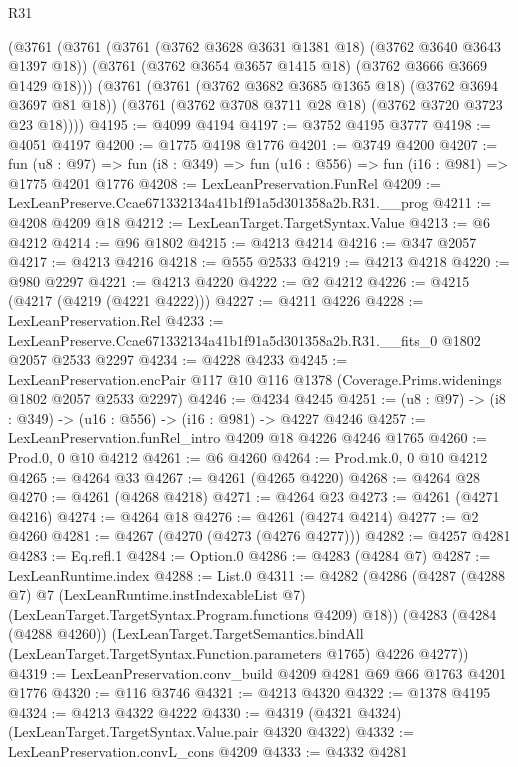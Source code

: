 \begin{lexlean}{R31}
\begin{coremodule}
    (@3761
      (@3761
        (@3761 (@3762 @3628 @3631 @1381 @18) (@3762 @3640 @3643 @1397 @18))
        (@3761 (@3762 @3654 @3657 @1415 @18) (@3762 @3666 @3669 @1429 @18)))
      (@3761
        (@3761 (@3762 @3682 @3685 @1365 @18) (@3762 @3694 @3697 @81 @18))
        (@3761 (@3762 @3708 @3711 @28 @18) (@3762 @3720 @3723 @23 @18))))
@4195 := @4099 @4194
@4197 := @3752 @4195 @3777
@4198 := @4051 @4197
@4200 := @1775 @4198 @1776
@4201 := @3749 @4200
@4207 := fun (u8 : @97) =>
  fun (i8 : @349) => fun (u16 : @556) => fun (i16 : @981) => @1775 @4201 @1776
@4208 := LexLeanPreservation.FunRel
@4209 := LexLeanPreserve.Ccae671332134a41b1f91a5d301358a2b.R31.__prog
@4211 := @4208 @4209 @18
@4212 := LexLeanTarget.TargetSyntax.Value
@4213 := @6 @4212
@4214 := @96 @1802
@4215 := @4213 @4214
@4216 := @347 @2057
@4217 := @4213 @4216
@4218 := @555 @2533
@4219 := @4213 @4218
@4220 := @980 @2297
@4221 := @4213 @4220
@4222 := @2 @4212
@4226 := @4215 (@4217 (@4219 (@4221 @4222)))
@4227 := @4211 @4226
@4228 := LexLeanPreservation.Rel
@4233 := LexLeanPreserve.Ccae671332134a41b1f91a5d301358a2b.R31.__fits_0 @1802 @2057 @2533 @2297
@4234 := @4228 @4233
@4245 := LexLeanPreservation.encPair
    @117
    @10
    @116
    @1378
    (Coverage.Prims.widenings @1802 @2057 @2533 @2297)
@4246 := @4234 @4245
@4251 := (u8 : @97) -> (i8 : @349) -> (u16 : @556) -> (i16 : @981) -> @4227 @4246
@4257 := LexLeanPreservation.funRel_intro @4209 @18 @4226 @4246 @1765
@4260 := Prod.{0, 0} @10 @4212
@4261 := @6 @4260
@4264 := Prod.mk.{0, 0} @10 @4212
@4265 := @4264 @33
@4267 := @4261 (@4265 @4220)
@4268 := @4264 @28
@4270 := @4261 (@4268 @4218)
@4271 := @4264 @23
@4273 := @4261 (@4271 @4216)
@4274 := @4264 @18
@4276 := @4261 (@4274 @4214)
@4277 := @2 @4260
@4281 := @4267 (@4270 (@4273 (@4276 @4277)))
@4282 := @4257 @4281
@4283 := Eq.refl.{1}
@4284 := Option.{0}
@4286 := @4283 (@4284 @7)
@4287 := LexLeanRuntime.index
@4288 := List.{0}
@4311 := @4282
    (@4286
      (@4287
        (@4288 @7)
        @7
        (LexLeanRuntime.instIndexableList @7)
        (LexLeanTarget.TargetSyntax.Program.functions @4209)
        @18))
    (@4283
      (@4284 (@4288 @4260))
      (LexLeanTarget.TargetSemantics.bindAll
        (LexLeanTarget.TargetSyntax.Function.parameters @1765)
        @4226
        @4277))
@4319 := LexLeanPreservation.conv_build @4209 @4281 @69 @66 @1763 @4201 @1776
@4320 := @116 @3746
@4321 := @4213 @4320
@4322 := @1378 @4195
@4324 := @4213 @4322 @4222
@4330 := @4319 (@4321 @4324) (LexLeanTarget.TargetSyntax.Value.pair @4320 @4322)
@4332 := LexLeanPreservation.convL_cons @4209
@4333 := @4332 @4281

\end{coremodule}
\end{lexlean}
